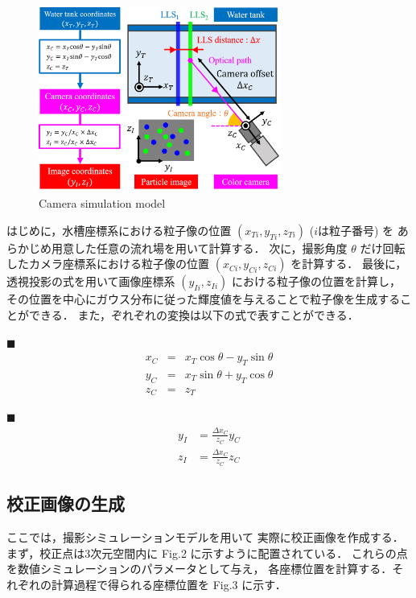 \documentclass[twocolumn,a4j]{jsarticle}
\begin{document}
\begin{figure}[htbp]
  \centering
  \includegraphics[keepaspectratio, width=80mm]{../images/Numerical_Simulation/Perspective_projection.png}
  \caption{Camera simulation model}
\end{figure}

\newpage
はじめに，水槽座標系における粒子像の位置 $(x_{Ti}, y_{Ti}, z_{Ti})$ ($i$は粒子番号) を
あらかじめ用意した任意の流れ場を用いて計算する．
次に，撮影角度 $\theta$ だけ回転したカメラ座標系における粒子像の位置
$(x_{Ci}, y_{Ci}, z_{Ci})$ を計算する．
最後に，透視投影の式を用いて画像座標系 $(y_{Ii}, z_{Ii})$ における粒子像の位置を計算し，
その位置を中心にガウス分布に従った輝度値を与えることで粒子像を生成することができる．
また，ぞれぞれの変換は以下の式で表すことができる．

 \baselineskip
\noindent $\blacksquare$ 
\begin{eqnarray*}
  x_C &=& x_T \cos \theta - y_T \sin \theta \\
  y_C &=& x_T \sin \theta + y_T \cos \theta \\
  z_C &=& z_T
\end{eqnarray*}

\noindent $\blacksquare$ 
\begin{eqnarray*}
  y_I &= \frac{\Delta x_C}{z_C} y_C \\
  z_I &= \frac{\Delta x_C}{z_C} z_C
\end{eqnarray*}

\subsection{校正画像の生成}
ここでは，撮影シミュレーションモデルを用いて
実際に校正画像を作成する．
まず，校正点は3次元空間内に Fig.2 に示すように配置されている．
これらの点を数値シミュレーションのパラメータとして与え，
各座標位置を計算する．それぞれの計算過程で得られる座標位置を
Fig.3 に示す．
\end{document}
